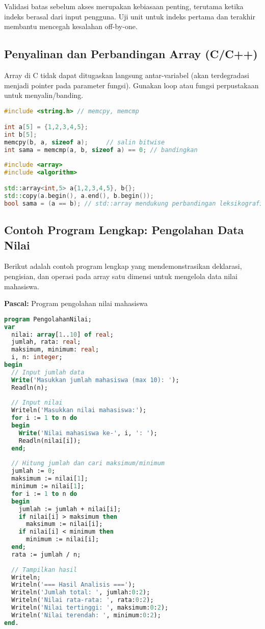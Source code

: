 \documentclass[../main.tex]{subfiles}
\begin{document}
Validasi batas sebelum akses merupakan kebiasaan penting, terutama ketika indeks berasal dari input pengguna. Uji unit untuk indeks pertama dan terakhir membantu mencegah kesalahan off-by-one.

\subsection{Penyalinan dan Perbandingan Array (C/C++)}
Array di C tidak dapat ditugaskan langsung antar-variabel (akan terdegradasi menjadi pointer pada parameter fungsi). Gunakan loop atau fungsi perpustakaan untuk menyalin/banding.

\begin{lstlisting}[language=C, caption={Salin dan bandingkan isi array (C)}]
#include <string.h> // memcpy, memcmp

int a[5] = {1,2,3,4,5};
int b[5];
memcpy(b, a, sizeof a);     // salin bitwise
int sama = memcmp(a, b, sizeof a) == 0; // bandingkan
\end{lstlisting}

\begin{lstlisting}[language=C++, caption={Salin/cek kesetaraan (C++)}]
#include <array>
#include <algorithm>

std::array<int,5> a{1,2,3,4,5}, b{};
std::copy(a.begin(), a.end(), b.begin());
bool sama = (a == b); // std::array mendukung perbandingan leksikografis
\end{lstlisting}

\subsection{Contoh Program Lengkap: Pengolahan Data Nilai}

Berikut adalah contoh program lengkap yang mendemonstrasikan deklarasi, pengisian, dan operasi pada array satu dimensi untuk mengelola data nilai mahasiswa.

\textbf{Pascal:} Program pengolahan nilai mahasiswa
\begin{lstlisting}[language=Pascal, caption={Program lengkap array 1D di Pascal}]
program PengolahanNilai;
var
  nilai: array[1..10] of real;
  jumlah, rata: real;
  maksimum, minimum: real;
  i, n: integer;
begin
  // Input jumlah data
  Write('Masukkan jumlah mahasiswa (max 10): ');
  Readln(n);
  
  // Input nilai
  Writeln('Masukkan nilai mahasiswa:');
  for i := 1 to n do
  begin
    Write('Nilai mahasiswa ke-', i, ': ');
    Readln(nilai[i]);
  end;
  
  // Hitung jumlah dan cari maksimum/minimum
  jumlah := 0;
  maksimum := nilai[1];
  minimum := nilai[1];
  for i := 1 to n do
  begin
    jumlah := jumlah + nilai[i];
    if nilai[i] > maksimum then
      maksimum := nilai[i];
    if nilai[i] < minimum then
      minimum := nilai[i];
  end;
  rata := jumlah / n;
  
  // Tampilkan hasil
  Writeln;
  Writeln('=== Hasil Analisis ===');
  Writeln('Jumlah total: ', jumlah:0:2);
  Writeln('Nilai rata-rata: ', rata:0:2);
  Writeln('Nilai tertinggi: ', maksimum:0:2);
  Writeln('Nilai terendah: ', minimum:0:2);
end.
\end{lstlisting}
\end{document}

